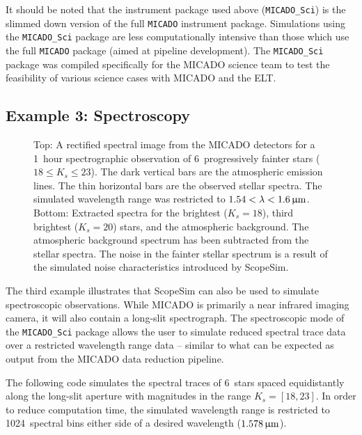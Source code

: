 It should be noted that the instrument package used above (\lstinline{MICADO_Sci}) is the slimmed down version of the full \lstinline{MICADO} instrument package.
Simulations using the \lstinline{MICADO_Sci} package are less computationally intensive than those which use the full \lstinline{MICADO} package (aimed at pipeline development).
The \lstinline{MICADO_Sci} package was compiled specifically for the MICADO science team to test the feasibility of various science cases with MICADO and the ELT.


\subsection{Example 3: Spectroscopy}
\label{example-3-spectroscopy}

\begin{figure}

\begin{center}
\caption{Top: A rectified spectral image from the MICADO detectors for a 1~hour spectrographic observation of 6~progressively fainter stars ($18\leq K_s\leq 23$).
The dark vertical bars are the atmospheric emission lines.
The thin horizontal bars are the observed stellar spectra.
The simulated wavelength range was restricted to $1.54<\lambda<1.6\,\upmu\mathrm{m}$.
Bottom: Extracted spectra for the brightest ($K_s=18$), third brightest ($K_s=20$) stars, and the atmospheric background.
The atmospheric background spectrum has been subtracted from the stellar spectra.
The noise in the fainter stellar spectrum is a result of the simulated noise characteristics introduced by ScopeSim.}
\label{fig:example-3-spectra}
\end{center}

\end{figure}

The third example illustrates that ScopeSim can also be used to simulate spectroscopic observations.
While MICADO is primarily a near infrared imaging camera, it will also contain a long-slit spectrograph.
The spectroscopic mode of the \lstinline{MICADO_Sci} package allows the user to simulate reduced spectral trace data over a restricted wavelength range data -- similar to what can be expected as output from the MICADO data reduction pipeline.

The following code simulates the spectral traces of 6~stars spaced equidistantly along the long-slit aperture with magnitudes in the range $K_s=[18, 23]$.
In order to reduce computation time, the simulated wavelength range is restricted to 1024~spectral bins either side of a desired wavelength ($1.578\,\upmu\mathrm{m}$).

